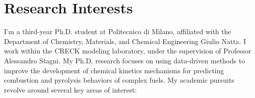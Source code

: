 \section{\sc Research Interests}
%
%
%
%


I'm a third-year Ph.D. student at Politecnico di Milano, affiliated with the Department of
Chemistry, Materials, and Chemical Engineering Giulio Natta. I work within the CRECK
modeling laboratory, under the supervision of Professor Alessandro Stagni. My Ph.D.
research focuses on using data-driven methods to improve the development of chemical
kinetics mechanisms for predicting combustion and pyrolysis behaviors of complex fuels.
My academic pursuits revolve around several key areas of interest:


